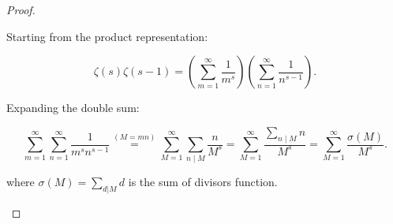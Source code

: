 \documentclass[11pt]{article}
\newcommand\0{\mathbf{0}}
\newcommand\<{\langle}
\renewcommand\>{\rangle}
\begin{document}
\begin{enumerate}
\begin{proof}
\begin{itemize}
Starting from the product representation:

\[
\zeta(s) \zeta(s-1) = \left( \sum_{m=1}^{\infty} \frac{1}{m^s} \right) \left( \sum_{n=1}^{\infty} \frac{1}{n^{s-1}} \right).
\]

Expanding the double sum:

\[
\sum_{m=1}^{\infty} \sum_{n=1}^{\infty} \frac{1}{m^s n^{s-1}} 
\overset{(M = mn)}{=}
\sum_{M=1}^{\infty} \sum_{n \mid M} \frac{n}{M^s} 
= \sum_{M=1}^{\infty} \frac{\sum_{n \mid M} n}{M^s} 
= \sum_{M=1}^{\infty} \frac{\sigma(M)}{M^s}.
\]

where \( \sigma(M) = \sum_{d|M} d \) is the sum of divisors function.
\end{itemize}
\end{proof}
\end{enumerate}


\end{document}
